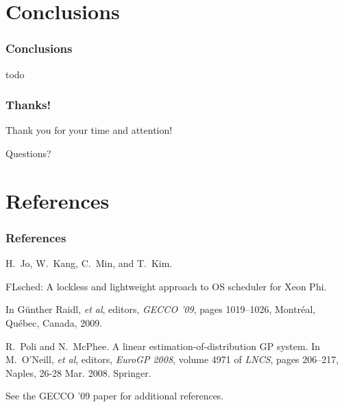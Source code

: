 \documentclass{beamer}
\newcommand{\linespace}{\vskip 0.25cm}
\begin{document}
\section[Conclusions]{Conclusions}

\begin{frame}
\frametitle{Conclusions}

todo

\end{frame}

\begin{frame}
\frametitle{Thanks!}

Thank you for your time and attention!

\begin{center}
{\huge Questions?}
\end{center}
\end{frame}

\section*{References}

\begin{frame} 
\frametitle{References} 

\begin{thebibliography}{lskdjf}

H.~Jo, W.~Kang, C.~Min, and T.~Kim.

\newblock FLsched: A lockless and lightweight approach to OS scheduler for Xeon Phi.

\newblock In G\"unther Raidl, \emph{et al}, editors, {\em GECCO '09}, pages 1019--1026, Montr\'eal, Qu\'ebec, Canada, 2009.

R.~Poli and N.~McPhee.
\newblock A linear estimation-of-distribution {GP} system.
\newblock In M.~O'Neill, \emph{et al}, editors, {\em EuroGP 2008}, volume
  4971 of {\em LNCS}, pages 206--217, Naples,
  26-28 Mar. 2008. Springer.
  
\end{thebibliography}

\linespace
\begin{center}
	See the GECCO '09 paper for additional references.
	\end{center}
\end{frame} 
\end{document}
